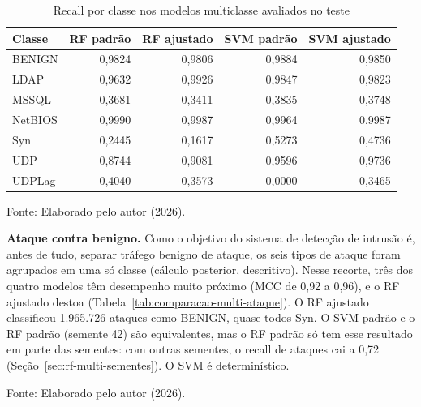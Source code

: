 \documentclass[
    12pt,                %
    openright,           %
    oneside,             %
    a4paper,             %
    english,             %
    brazil               %
]{abntex2}
\begin{document}
\begin{table}
\centering
\caption{Recall por classe nos modelos multiclasse avaliados no teste}
\label{tab:comparacao-multi-recall}
\begin{tabular}{lrrrr}
\hline
Classe & RF padrão & RF ajustado & SVM padrão & SVM ajustado \\
\hline
BENIGN  & 0,9824 & 0,9806 & 0,9884 & 0,9850 \\
LDAP    & 0,9632 & 0,9926 & 0,9847 & 0,9823 \\
MSSQL   & 0,3681 & 0,3411 & 0,3835 & 0,3748 \\
NetBIOS & 0,9990 & 0,9987 & 0,9964 & 0,9987 \\
Syn     & 0,2445 & 0,1617 & 0,5273 & 0,4736 \\
UDP     & 0,8744 & 0,9081 & 0,9596 & 0,9736 \\
UDPLag  & 0,4040 & 0,3573 & 0,0000 & 0,3465 \\
\hline
\end{tabular}
\par\smallskip
Fonte: Elaborado pelo autor (2026).
\end{table}
 
\textbf{Ataque contra benigno.} Como o objetivo do sistema de detecção de intrusão é, antes de tudo, separar tráfego benigno de ataque, os seis tipos de ataque foram agrupados em uma só classe (cálculo posterior, descritivo). Nesse recorte, três dos quatro modelos têm desempenho muito próximo (MCC de 0,92 a 0,96), e o RF ajustado destoa (Tabela~\ref{tab:comparacao-multi-ataque}). O RF ajustado classificou 1.965.726 ataques como BENIGN, quase todos Syn. O SVM padrão e o RF padrão (semente 42) são equivalentes, mas o RF padrão só tem esse resultado em parte das sementes: com outras sementes, o recall de ataques cai a 0,72 (Seção~\ref{sec:rf-multi-sementes}). O SVM é determinístico.
 
\begin{table}
\centering
\caption{Ataque contra BENIGN no teste (as seis classes de ataque agrupadas)}
\label{tab:comparacao-multi-ataque}
\footnotesize
{}
\par\smallskip
Fonte: Elaborado pelo autor (2026).
\end{table}
 
\end{document}
